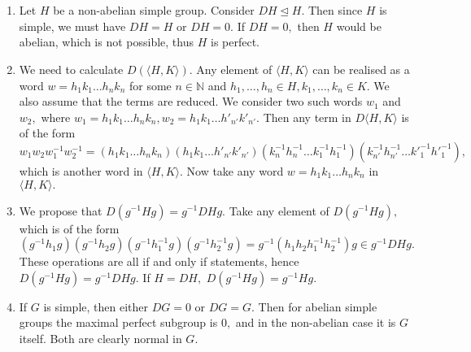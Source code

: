 \documentclass{article}
\title{} %
\author{Gandhar Kulkarni (mmat2304)} %
\date{} %
\begin{document}
\maketitle %


\section{} %
\section{} %
\begin{enumerate}
	\item Let $H$ be a non-abelian simple group. Consider $DH \trianglelefteq H.$ Then since $H$ is simple, we must have $DH= H$ or $DH=0.$ If $DH=0,$ then 
	$H$ would be abelian, which is not possible, thus $H$ is perfect.
	\item We need to calculate $D(\langle H,K\rangle).$ Any element of $\langle H,K \rangle$ can be realised as a word $w=h_1k_1\dots h_nk_n$ for some $n 
	\in \mathbb{N}$ and $h_1,\dots,h_n \in H, k_1,\dots,k_n \in K.$ We also assume that the terms are reduced. We consider two such words $w_1$ and $w_2,$ 
	where $w_1=h_1k_1\dots h_nk_n, w_2=h_1k_1\dots h'_{n'}k'_{n'}.$ Then any term in $D\langle H,K\rangle$ is of the form $w_1w_2w_1^{-1}w_2^{-1}= 
	(h_1k_1\dots h_nk_n)(h_1k_1\dots h'_{n'}k'_{n'})(k^{-1}_nh^{-1}_n\dots k^{-1}_{1}h^{-1}_{1})(k^{-1}_{n'}h^{-1}_{n'}\dots k'^{-1}_{1}h'^{-1}_{1}),$ which 
	is another word in $\langle H,K \rangle.$ Now take any word $w=h_1k_1\dots h_nk_n$ in $\langle H,K \rangle.$ 
	
	\item We propose that $D(g^{-1}Hg)=g^{-1}DHg.$ Take any element of $D(g^{-1}Hg),$ which is of the form 
	$(g^{-1}h_1g)(g^{-1}h_2g)(g^{-1}h_1^{-1}g)(g^{-1}h_2^{-1}g)=g^{-1}(h_1h_2h_1^{-1}h_2^{-1})g \in g^{-1}DHg.$ These operations are all if and only if 
	statements, hence $D(g^{-1}Hg)=g^{-1}DHg.$ If $H=DH,$ $D(g^{-1}Hg)=g^{-1}Hg.$
	\item If $G$ is simple, then either $DG=0$ or $DG=G.$ Then for abelian simple groups the maximal perfect subgroup is $0,$ and in the non-abelian case it 
	is $G$ itself. Both are clearly normal in $G.$ 
\end{enumerate}
\end{document}
